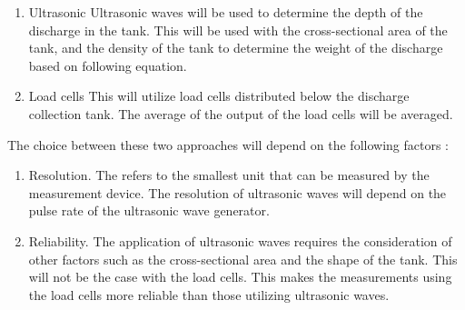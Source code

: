\begin{enumerate}
    \item Ultrasonic \newline
    Ultrasonic waves will be used to determine the depth of the discharge in the tank. This will be used with the cross-sectional area of the tank, and the density of the tank to determine the weight of the discharge based on following equation.
    \item Load cells \newline
    This will utilize load cells distributed below the discharge collection tank. The average of the output of the load cells will be averaged. 
\end{enumerate}

\par
The choice between these two approaches will depend on the following factors :
\begin{enumerate}
    \item Resolution. \newline
    The refers to the smallest unit that can be measured by the measurement device. The resolution of ultrasonic waves will depend on the pulse rate of the ultrasonic wave generator. 
    \item Reliability. \newline
    The application of ultrasonic waves requires the consideration of other factors such as the cross-sectional area and the shape of the tank. This will not be the case with the load cells. This makes the measurements using the load cells more reliable than those utilizing ultrasonic waves.
\end{enumerate}

